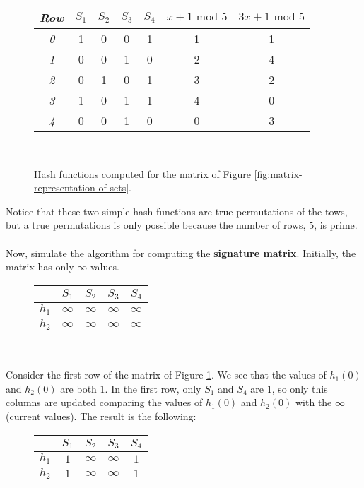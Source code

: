 \begin{figure}[H]
\centering
\begin{tabular}{|c|c|c|c|c||c|c|}
  \hline
  \textit{Row} & $S_1$ & $S_2$ & $S_3$ & $S_4$ & $x + 1 \text{ mod } 5$ & $3x + 1 \text{ mod } 5$\\
  \hline
  \textit{0} & 1 & 0 & 0 & 1 & 1 & 1 \\
  \textit{1} & 0 & 0 & 1 & 0 & 2 & 4 \\
  \textit{2} & 0 & 1 & 0 & 1 & 3 & 2 \\
  \textit{3} & 1 & 0 & 1 & 1 & 4 & 0 \\
  \textit{4} & 0 & 0 & 1 & 0 & 0 & 3 \\
  \hline
\end{tabular}
\captionsetup{justification=centering}\\
\caption{Hash functions computed for the matrix of Figure \ref{fig:matrix-representation-of-sets}.}
\label{fig:matrix-hash-functions}
\end{figure}

Notice that these two simple hash functions are true permutations of the tows, but a true permutations is only possible because the number of rows, $5$, is prime.
\\
\\
Now, simulate the algorithm for computing the \textbf{signature matrix}. Initially, the matrix has only $\infty$ values. 

\begin{figure}[H]
\centering
\begin{tabular}{|c||c|c|c|c|}
  \hline
   & $S_1$ & $S_2$ & $S_3$ & $S_4$\\
  \hline
  $h_1$ & $\infty$ & $\infty$ & $\infty$ & $\infty$ \\ 
  $h_2$ & $\infty$ & $\infty$ & $\infty$ & $\infty$ \\
  \hline
\end{tabular}
\captionsetup{justification=centering}\\
\label{fig:sig-matrix-0}
\end{figure}

Consider the first row of the matrix of Figure \ref{fig:matrix-hash-functions}. We see that the values of $h_1(0)$ and $h_2(0)$ are both $1$. In the first row, only $S_1$ and $S_4$ are $1$, so only this columns are updated comparing the values of $h_1(0)$ and $h_2(0)$ with the $\infty$ (current values). The result is the following: 

\begin{figure}[H]
\centering
\begin{tabular}{|c||c|c|c|c|}
  \hline
   & $S_1$ & $S_2$ & $S_3$ & $S_4$\\
  \hline
  $h_1$ & $1$ & $\infty$ & $\infty$ & $1$ \\ 
  $h_2$ & $1$ & $\infty$ & $\infty$ & $1$ \\
  \hline
\end{tabular}
\captionsetup{justification=centering}\\
\label{fig:sig-matrix-1}
\end{figure}

